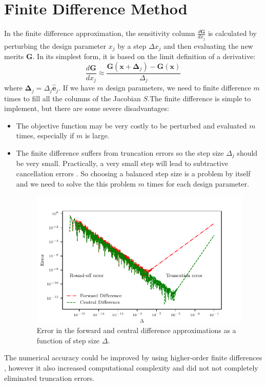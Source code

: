 \documentclass{tufte-handout}
\begin{document}
\section{Finite Difference Method}
In the finite difference approximation, the sensitivity column $\frac{d \mathbf{G}}{dx_j}$  is calculated by perturbing the design parameter $x_j$  by a step $\Delta x_j$ and then evaluating the new merits $\mathbf{G}$.  In its simplest form, it is based on the limit definition of a derivative:
\begin{equation}
\frac{d \mathbf{G}}{dx_j} \approx  \frac{\mathbf{G}(\mathbf{x} + \mathbf{\Delta}_j) - \mathbf{G}(\mathbf{x})}{\Delta_j}
\end{equation}
where $\mathbf{\Delta}_j = \Delta_j {\mathbf{\hat{e}}_j}$.
If we have $m$ design parameters, we need to finite difference $m$ times to fill all the columns of the Jacobian $S$.The finite difference is simple to implement, but there are  some severe disadvantages: 
\begin{itemize}
	\item The objective function  may be very costly to be perturbed and evaluated $m$ times, especially if $m$ is large.
	\item The finite difference suffers from truncation errors   so the step size $\Delta_j$  should be very  small. Practically, a very small step will lead to subtractive cancellation errors . So choosing a balanced step size is a problem by itself and we need to solve the this problem $m$ times for each design parameter. 

	
	\begin{figure}[h]
		\includegraphics[width=\linewidth]{fd_error_types.pdf}%
		\caption{Error in the forward  and central difference approximations as a function of step size $\Delta$.}%
		\label{fig:fullfig}%
	\end{figure}

	
\end{itemize}
 The numerical accuracy could be improved by using higher-order finite differences , however it also   increased computational complexity and did not not completely eliminated truncation errors.
\end{document}
